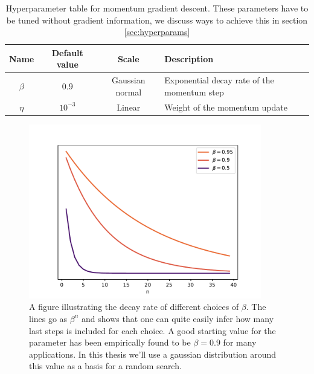 \begin{table}
\begin{tabular}{cccl}
\toprule
Name &Default value & Scale  & Description\\
\midrule
$\beta$  & $0.9$ & Gaussian normal & Exponential decay rate of the momentum step\\
$\eta$  & $10^{-3}$ & Linear & Weight of the momentum update \\
\bottomrule
\end{tabular}
\caption{Hyperparameter table for momentum gradient descent. These parameters have to be tuned without gradient information, we discuss ways to achieve this in section \ref{sec:hyperparams}}\label{tab:momentum}
\end{table}


\begin{figure}
\centering
\includegraphics[height=3in]{../figures/beta_decay.pdf}
\caption[Exponential decay in momentum gradient descent]{A figure illustrating the decay rate of different choices of $\beta$. The lines go as $\beta^n$ and shows that one can quite easily infer how many last steps is included for each choice. A good starting value for the parameter has been empirically found to be $\beta=0.9$ for many applications. In this thesis we'll use a gaussian distribution around this value as a basis for a random search.}\label{fig:beta}
\end{figure}

